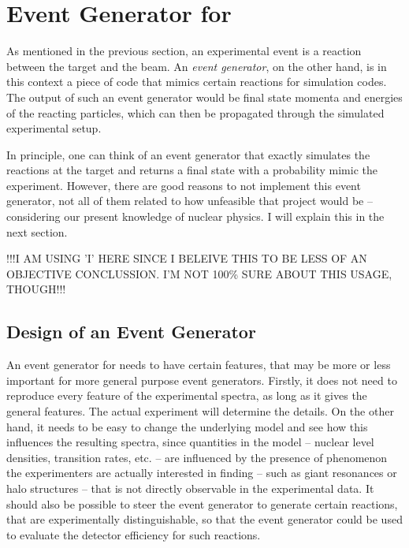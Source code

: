 \section{Event Generator for \rtb{}}
As mentioned in the previous section, an experimental event is a reaction between the target and the beam.
An \emph{event generator}, on the other hand, is in this context a piece of code that mimics certain reactions for simulation codes. The output of such an event generator would be final state momenta and energies of the reacting particles, which can then be propagated through the simulated experimental setup. %

In principle, one can think of an event generator that exactly simulates the reactions at the target and returns a final state with a probability mimic the experiment. However, there are good reasons to not implement this event generator, not all of them related to how unfeasible that project would be -- considering our present knowledge of nuclear physics. I will explain this in the next section.

!!!I AM USING 'I' HERE SINCE I BELEIVE THIS TO BE LESS OF AN OBJECTIVE CONCLUSSION. I'M NOT 100\% SURE ABOUT THIS USAGE, THOUGH!!!

\subsection{Design of an Event Generator}
An event generator for \rtb{} needs to have certain features, that may be more or less important for more general purpose event generators.
Firstly, it does not need to reproduce every feature of the experimental spectra, as long as it gives the general features. The actual experiment will determine the details.
On the other hand, it needs to be easy to change the underlying model and see how this influences the resulting spectra, since quantities in the model -- nuclear level densities, transition rates, etc. -- are influenced by the presence of phenomenon the experimenters are actually interested in finding -- such as giant resonances or halo structures -- that is not directly observable in the experimental data. 
It should also be possible to steer the event generator to generate certain reactions, that are experimentally distinguishable, so that the event generator could be used to evaluate the detector efficiency for such reactions.

